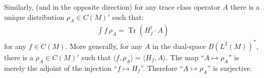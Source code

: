 \documentclass[final,leqno]{siamart}
\newcommand{\pder}[2]{\ensuremath{\frac{ \partial #1}{\partial #2}}}
\DeclareMathOperator{\Tr}{Tr}
\begin{document}
Similarly, (and in the opposite direction) for any trace class operator $A$ there is a unique distribution $\rho_{A} \in C(M)'$ such that: 
\begin{align*}
	 \int f \, \rho_{A} = \Tr ( H_{f}^{\dagger} \cdot A )
\end{align*}
for any $f \in C(M)$.
More generally, for any $A$ in the dual-space $B( L^{2}(M) )^{*}$, there is a $\rho_{A} \in C(M)'$ such that $\langle f , \rho_{A} \rangle = \langle H_{f} , A \rangle$.
The map ``$A \mapsto \rho_{A}$'' is merely the adjoint of the injection ``$f \mapsto H_{f}$''. Therefore ``$A \mapsto \rho_{A}$'' is surjective.

\end{document}
